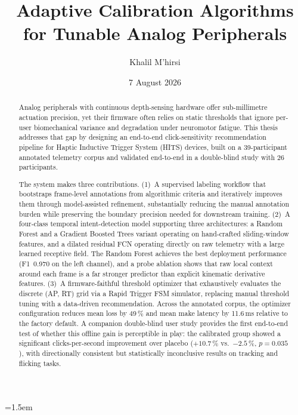 \documentclass[a4paper,11pt,oneside,openany]{report}
\title{Adaptive Calibration Algorithms\\for Tunable Analog Peripherals}
\author{Khalil M'hirsi}
\date{7 August 2026}
\begin{document}
\maketitle
\makeacks

\begin{abstract}
Analog peripherals with continuous depth-sensing hardware offer sub-millimetre
actuation precision, yet their firmware often relies on static thresholds that
ignore per-user biomechanical variance and degradation under neuromotor fatigue.
This thesis addresses that gap by designing an end-to-end click-sensitivity
recommendation pipeline for Haptic Inductive Trigger System (HITS) devices, built
on a 39-participant annotated telemetry corpus and validated end-to-end in a
double-blind study with 26 participants.

The system makes three contributions.
(1)~A supervised labeling workflow that bootstraps frame-level annotations from
algorithmic criteria and iteratively improves them through model-assisted
refinement, substantially reducing the manual annotation burden while
preserving the boundary precision needed for downstream training.
(2)~A four-class temporal intent-detection model supporting three
architectures: a Random Forest and a Gradient Boosted Trees variant operating
on hand-crafted sliding-window features, and a dilated residual FCN operating
directly on raw telemetry with a large learned receptive field. The Random Forest
achieves the best deployment performance (F1~0.970 on the left channel), and
a probe ablation shows that raw local context around each frame is a far
stronger predictor than explicit kinematic derivative features.
(3)~A firmware-faithful threshold optimizer that exhaustively evaluates the
discrete (AP, RT) grid via a Rapid Trigger FSM simulator, replacing manual
threshold tuning with a data-driven recommendation. Across the annotated
corpus, the optimizer configuration reduces mean loss by 49\,\% and mean make
latency by 11.6\,ms relative to the factory default. A companion double-blind
user study provides the first end-to-end test of whether this offline gain is
perceptible in play: the calibrated group showed a significant
clicks-per-second improvement over placebo ($+10.7$\,\% vs.\ $-2.5$\,\%,
$p=0.035$), with directionally consistent but statistically inconclusive
results on tracking and flicking tasks.
\end{abstract}

\clearpage

\maketoc

\emergencystretch=1.5em   %
\end{document}
